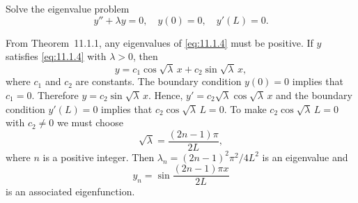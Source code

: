 \setcounter{example}{1}
\setcounter{equation}{3}
\begin{example}[Problem 3]
  \label{example:11.1.2} \rm Solve the eigenvalue problem
  \begin{equation}
    \label{eq:11.1.4}y''+\lambda y=0,\quad y(0)=0,\quad y'(L)=0.
  \end{equation}

  \solution From Theorem~11.1.1, any eigenvalues of \eqref{eq:11.1.4} must be
  positive. If $y$ satisfies \eqref{eq:11.1.4} with $\lambda>0$, then
  \[
    y=c_{1}\cos\sqrt{\lambda}\,x+c_{2}\sin\sqrt{\lambda}\,x,
  \]
  where $c_{1}$ and $c_{2}$ are constants. The boundary condition $y(0)=0$ implies that $c_{1}=0$.
  Therefore $y=c_{2}\sin\sqrt{\lambda}\,x$. Hence, $y'=c_{2}\sqrt{\lambda}\cos\sqrt{\lambda}\,x$ and
  the boundary condition $y'(L)=0$ implies that $c_{2}\cos\sqrt{\lambda}\,L=0$. To make
  $c_{2}\cos\sqrt{\lambda}\,L=0$ with $c_{2}\ne0$ we must choose
  \[
    \sqrt{\lambda}=\frac{(2n-1)\pi}{2L},
  \]
  where $n$ is a positive integer. Then $\lambda_{n}=(2n-1)^{2}\pi^{2}/4L^{2}$ is an eigenvalue and
  \[
    y_{n}=\sin\frac{(2n-1)\pi x}{2L}
  \]
  is an associated eigenfunction. \bbox
\end{example}

